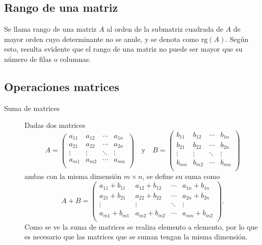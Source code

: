\documentclass[a4paper]{article}
\begin{document}
\subsection*{Rango de una matriz}
Se llama rango de una matriz $A$ al orden de la submatriz cuadrada de $A$ de mayor orden cuyo determinante no se anule, y se denota como $\textrm{rg}(A)$. Según esto, resulta evidente que el rango de una matriz no puede ser mayor que su número de filas o columnas.

\subsection*{Operaciones matrices}

\begin{description}
\item [Suma de matrices]
Dadas dos matrices
\[A=
\left(
\begin{array}{cccc}
 a_{11} & a_{12} & \cdots & a_{1n} \\
 a_{21} & a_{22} & \cdots & a_{2n} \\
 \vdots & \vdots & \ddots & \vdots \\
 a_{m1} & a_{m2} & \cdots & a_{mn} \\
\end{array}
\right)
\quad \textrm{y} \quad
B=\left(
\begin{array}{cccc}
 b_{11} & b_{12} & \cdots & b_{1n} \\
 b_{21} & b_{22} & \cdots & b_{2n} \\
 \vdots & \vdots & \ddots & \vdots \\
 b_{mn} & b_{m2} & \cdots & b_{mn} \\
\end{array}
\right)
\]
ambas con la misma dimensión $m\times n$, se define su suma como
\[
A+B=
\left(
\begin{array}{cccc}
 a_{11}+b_{11} & a_{12}+b_{12} & \cdots & a_{1n}+b_{1n} \\
 a_{21}+b_{21} & a_{22}+b_{22} & \cdots & a_{2n}+b_{2n} \\
 \vdots & \vdots & \ddots & \vdots \\
 a_{m1}+b_{m1} & a_{m2}+b_{m2} & \cdots & a_{mn}+b_{m2} \\
\end{array}
\right).
\]
Como se ve la suma de matrices se realiza elemento a elemento, por lo que es necesario que las matrices que se suman tengan la misma dimensión.


\end{description}
\end{document}
